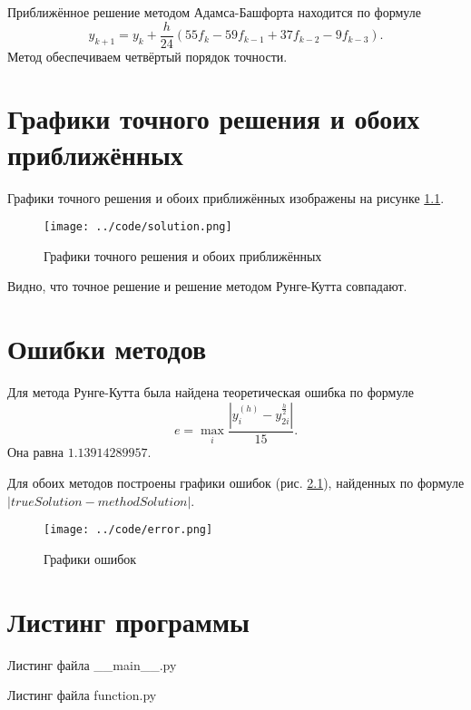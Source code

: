 Приближённое решение методом Адамса-Башфорта находится по формуле
$$y_{k + 1} =
  y_k + \frac{h}{24} \left( 55f_k - 59f_{k - 1} + 37f_{k - 2} - 9f_{k - 3} \right).$$
Метод обеспечиваем четвёртый порядок точности.

\chapter{Графики точного решения и обоих приближённых}

Графики точного решения и обоих приближённых изображены на рисунке \ref{fig:solution}.

\begin{figure}[h!]
  \centering
  \texttt{[image: ../code/solution.png]}
  \caption{Графики точного решения и обоих приближённых}
  \label{fig:solution}
\end{figure}

Видно, что точное решение и решение методом Рунге-Кутта совпадают.

\chapter{Ошибки методов}

Для метода Рунге-Кутта была найдена теоретическая ошибка по формуле
$$e =
  \max \limits_i \frac{ \left| y_i^{ \left( h \right) } - y_{2i}^{ \frac{h}{2}} \right| }{15}.$$
Она равна $1.13914289957$.

Для обоих методов построены графики ошибок (рис. \ref{fig:error}),
найденных по формуле $ \left| trueSolution - methodSolution \right| $.

\begin{figure}[h!]
  \centering
  \texttt{[image: ../code/error.png]}
  \caption{Графики ошибок}
  \label{fig:error}
\end{figure}

\chapter{Листинг программы}

Листинг файла \_\_main\_\_.py
\lstset{inputencoding=utf8, extendedchars=\true}


 Листинг файла function.py
 \lstset{inputencoding=utf8, extendedchars=\true}
 

